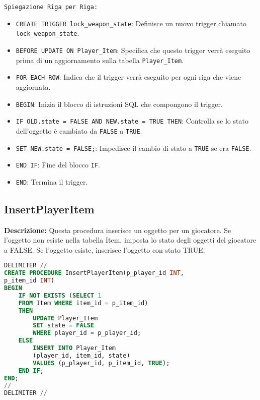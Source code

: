 \documentclass{article}
\begin{document}
\texttt{Spiegazione Riga per Riga:}
\begin{itemize}
    \item \lstinline|CREATE TRIGGER lock_weapon_state|: Definisce un nuovo trigger chiamato \lstinline|lock_weapon_state|.
    \item \lstinline|BEFORE UPDATE ON Player_Item|: Specifica che questo trigger verrà eseguito prima di un aggiornamento sulla tabella \lstinline|Player_Item|.
    \item \lstinline|FOR EACH ROW|: Indica che il trigger verrà eseguito per ogni riga che viene aggiornata.
    \item \lstinline|BEGIN|: Inizia il blocco di istruzioni SQL che compongono il trigger.
    \item \lstinline|IF OLD.state = FALSE AND NEW.state = TRUE THEN|: Controlla se lo stato dell'oggetto è cambiato da \lstinline|FALSE| a \lstinline|TRUE|.
    \item \lstinline|SET NEW.state = FALSE;|: Impedisce il cambio di stato a \lstinline|TRUE| se era \lstinline|FALSE|.
    \item \lstinline|END IF|: Fine del blocco \lstinline|IF|.
    \item \lstinline|END|: Termina il trigger.
\end{itemize}

\subsection*{InsertPlayerItem}

\textbf{Descrizione:} Questa procedura inserisce un oggetto per un giocatore. Se l'oggetto non esiste nella tabella Item, imposta lo stato degli oggetti del giocatore a FALSE. Se l'oggetto esiste, inserisce l'oggetto con stato TRUE.

\begin{lstlisting}[language=SQL]
DELIMITER //
CREATE PROCEDURE InsertPlayerItem(p_player_id INT,
p_item_id INT)
BEGIN
    IF NOT EXISTS (SELECT 1
    FROM Item WHERE item_id = p_item_id)
    THEN
        UPDATE Player_Item
        SET state = FALSE
        WHERE player_id = p_player_id;
    ELSE
        INSERT INTO Player_Item
        (player_id, item_id, state)
        VALUES (p_player_id, p_item_id, TRUE);
    END IF;
END;
//
DELIMITER //
\end{lstlisting}
\end{document}
